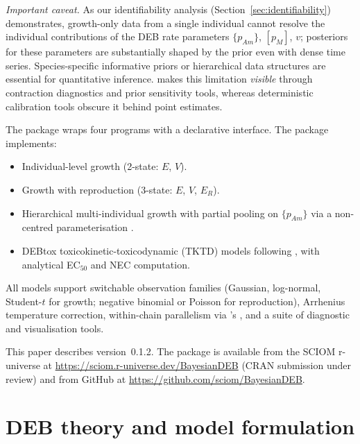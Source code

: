 \documentclass[article,shortnames]{jss}
\newcommand{\pAm}{\{p_{Am}\}}
\newcommand{\pM}{[p_M]}
\begin{document}
\emph{Important caveat.}  As our identifiability analysis
(Section~\ref{sec:identifiability}) demonstrates, growth-only data
from a single individual cannot resolve the individual contributions
of the DEB rate parameters $\pAm$, $\pM$, $v$; posteriors for these
parameters are substantially shaped by the prior even with dense
time series.  Species-specific informative priors or hierarchical
data structures are essential for quantitative inference.
 makes this limitation \emph{visible} through
contraction diagnostics and prior sensitivity tools, whereas
deterministic calibration tools obscure it behind point estimates.

The  package wraps four 
\citep{CarpenterStan2017} programs with a declarative 
interface.  The package implements:
\begin{itemize}
  \item Individual-level growth (2-state: $E$, $V$).
  \item Growth with reproduction (3-state: $E$, $V$, $E_R$).
  \item Hierarchical multi-individual growth with partial pooling on
    $\pAm$ via a non-centred parameterisation
    \citep{BetancourtHierarchical2015}.
  \item DEBtox toxicokinetic-toxicodynamic (TKTD) models following
    \citet{JagerDEBtox2006}, with analytical EC$_{50}$ and NEC
    computation.
\end{itemize}

All models support switchable observation families (Gaussian,
log-normal, Student-$t$ for growth; negative binomial or Poisson for
reproduction), Arrhenius temperature correction, within-chain
parallelism via 's , and a suite of
diagnostic and visualisation tools.

This paper describes  version~0.1.2.  The package is
available from the SCIOM r-universe at
\url{https://sciom.r-universe.dev/BayesianDEB} (CRAN submission
under review) and from GitHub
at \url{https://github.com/sciom/BayesianDEB}.


\section{DEB theory and model formulation} \label{sec:theory}
\end{document}
